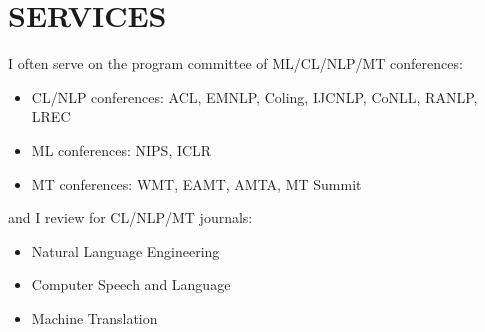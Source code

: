 

\section*{SERVICES}

I often serve on the program committee of ML/CL/NLP/MT conferences:
\begin{itemize}
	\item CL/NLP conferences: ACL, EMNLP, Coling, IJCNLP, CoNLL, RANLP, LREC
	\item ML conferences: NIPS, ICLR
	\item MT conferences: WMT, EAMT, AMTA, MT Summit
\end{itemize}
and I review for CL/NLP/MT journals:
\begin{itemize}
	\item Natural Language Engineering
	\item Computer Speech and Language
	\item Machine Translation
\end{itemize}

